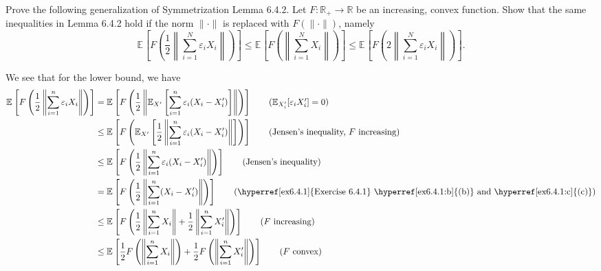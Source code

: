 \begin{problem*}[Exercise 6.4.5]\label{ex6.4.5}
	Prove the following generalization of Symmetrization Lemma 6.4.2. Let \(F \colon \mathbb{R} _+ \to \mathbb{R} \) be an increasing, convex function. Show that the same inequalities in Lemma 6.4.2 hold if the norm \(\lVert \cdot \rVert \) is replaced with \(F(\lVert \cdot \rVert )\), namely
	\[
		\mathbb{E}_{}\left[F \left( \frac{1}{2}\left\lVert \sum_{i=1}^{N} \varepsilon _i X_i \right\rVert \right) \right]
		\leq \mathbb{E}_{}\left[F \left( \left\lVert \sum_{i=1}^{N} X_i \right\rVert \right) \right]
		\leq \mathbb{E}_{}\left[F \left( 2 \left\lVert \sum_{i=1}^{N} \varepsilon _i X_i \right\rVert \right) \right] .
	\]
\end{problem*}
\begin{answer}
	We see that for the lower bound, we have
	\begin{align*}
		\mathbb{E}_{}\left[F \left( \frac{1}{2} \left\lVert \sum_{i=1}^{n} \varepsilon _i X_i \right\rVert  \right) \right]
		 & = \mathbb{E}_{}\left[F \left( \frac{1}{2} \left\lVert \mathbb{E}_{X^{\prime} }\left[\sum_{i=1}^{n} \varepsilon _i (X_i - X_i^{\prime} ) \right] \right\rVert \right) \right] \tag*{(\(\mathbb{E}_{X^{\prime}_i }[\varepsilon _i X_i^{\prime} ] = 0 \))} \\
		 & \leq \mathbb{E}_{}\left[F \left( \mathbb{E}_{X^{\prime} }\left[ \frac{1}{2} \left\lVert \sum_{i=1}^{n} \varepsilon _i (X_i - X_i^{\prime} ) \right\rVert \right] \right) \right] \tag*{(Jensen's inequality, \(F\) increasing)}                         \\
		 & \leq \mathbb{E}_{}\left[F \left( \frac{1}{2} \left\lVert \sum_{i=1}^{n} \varepsilon _i (X_i - X_i^{\prime} ) \right\rVert \right) \right] \tag*{(Jensen's inequality)}                                                                                  \\
		 & = \mathbb{E}_{}\left[F \left( \frac{1}{2} \left\lVert \sum_{i=1}^{n} (X_i - X_i^{\prime} ) \right\rVert \right) \right] \tag*{(\hyperref[ex6.4.1]{Exercise 6.4.1} \hyperref[ex6.4.1:b]{(b)} and \hyperref[ex6.4.1:c]{(c)})}                             \\
		 & \leq \mathbb{E}_{}\left[F \left( \frac{1}{2} \left\lVert \sum_{i=1}^{n} X_i \right\rVert + \frac{1}{2} \left\lVert \sum_{i=1}^{n} X_i^{\prime} \right\rVert \right) \right] \tag*{(\(F\) increasing)}                                                   \\
		 & \leq \mathbb{E}_{}\left[\frac{1}{2} F \left( \left\lVert \sum_{i=1}^{n} X_i \right\rVert \right) +  \frac{1}{2} F \left( \left\lVert \sum_{i=1}^{n} X_i^{\prime} \right\rVert \right) \right] \tag*{(\(F\) convex)}                                     \\

\end{align*}
\end{answer}
